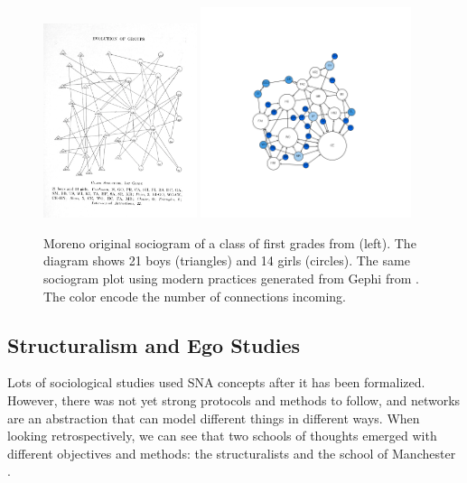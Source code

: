 \begin{figure}
    \centering %
    \includegraphics[width=0.4\textwidth]{static/figures/RelatedWork/Moreno-1}
    \includegraphics[width=0.55\textwidth]{static/figures/RelatedWork/Moreno-1_GrandJean}
    \caption{Moreno original sociogram of a class of first grades from \cite{morenoWhoShallSurvive1934} (left). The diagram shows 21 boys (triangles) and 14 girls (circles). The same sociogram plot using modern practices generated from Gephi from \cite{grandjeanSocialNetworkAnalysis2015}. The color encode the number of connections incoming.}
    \label{fig:moreno-sociogram}
\end{figure}



\subsection{Structuralism and Ego Studies}

Lots of sociological studies used SNA concepts after it has been formalized.
However, there was not yet strong protocols and methods to follow, and networks are an abstraction that can model different things in different ways.
When looking retrospectively, we can see that two schools of thoughts emerged with different objectives and methods: the structuralists and the school of Manchester \cite{eveDeuxTraditionsAnalyse2002, maurizio2000, freeman_development_2004}.

